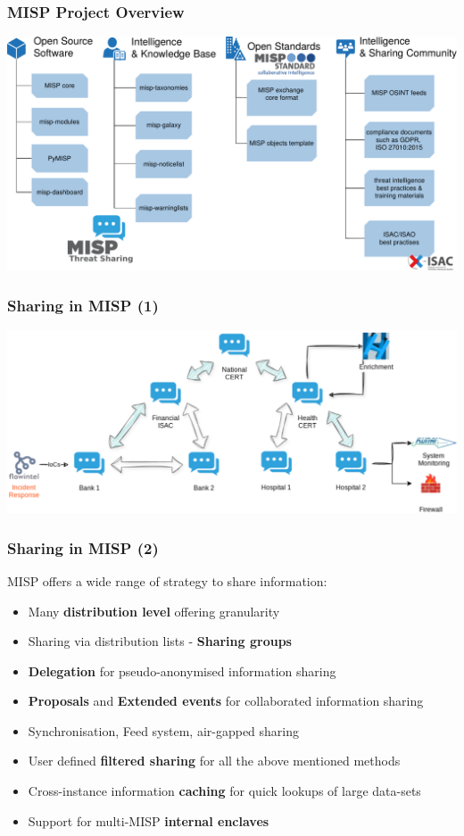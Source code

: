 \begin{frame}
    \frametitle{MISP Project Overview}
    \begin{center}
        \includegraphics[width=0.85\linewidth]{misp-overview-simplified.pdf}
    \end{center}
\end{frame}


\begin{frame}
    \frametitle{Sharing in MISP (1)}
    \begin{center}
        \includegraphics[width=0.99\linewidth]{misp-infosharing.png}
    \end{center}
\end{frame}

\begin{frame}
    \frametitle{Sharing in MISP (2)}
    MISP offers a wide range of strategy to share information:
    \begin{itemize}
        \item Many {\bf distribution level} offering granularity
        \item Sharing via distribution lists - {\bf Sharing groups}
        \item {\bf Delegation} for pseudo-anonymised information sharing
        \item {\bf Proposals} and {\bf Extended events} for collaborated information sharing
        \item Synchronisation, Feed system, air-gapped sharing
        \item User defined {\bf filtered sharing} for all the above mentioned methods
        \item Cross-instance information {\bf caching} for quick lookups of large data-sets
        \item Support for multi-MISP \textbf{internal enclaves}
    \end{itemize}
\end{frame}


